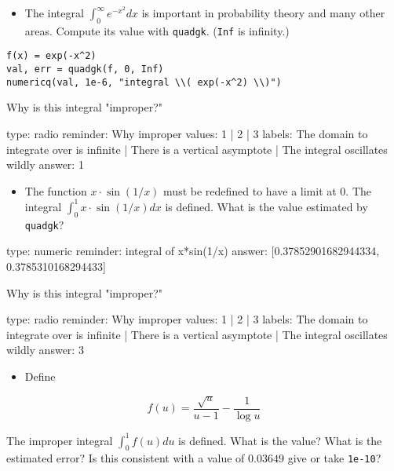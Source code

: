 \documentclass[12pt]{article}
\begin{document}
\begin{itemize}
\itemsep1pt\parskip0pt
\item
  The integral $\int_0^\infty e^{-x^2} dx$ is important in probability
  theory and many other areas. Compute its value with \texttt{quadgk}.
  (\texttt{Inf} is infinity.)
\end{itemize}



\begin{verbatim}
f(x) = exp(-x^2)
val, err = quadgk(f, 0, Inf)
numericq(val, 1e-6, "integral \\( exp(-x^2) \\)")
\end{verbatim}
Why is this integral "improper?"

\begin{answer}
type: radio
reminder: Why improper
values: 1 | 2 | 3
labels: The domain to integrate over is infinite | There is a vertical asymptote | The integral oscillates wildly
answer: 1
\end{answer}

\begin{itemize}
\itemsep1pt\parskip0pt
\item
  The function $x \cdot \sin(1/x)$ must be redefined to have a limit at
  $0$. The integral $\int_0^1 x \cdot \sin(1/x)dx$ is defined. What is
  the value estimated by \texttt{quadgk}?
\end{itemize}

\begin{answer}
    type: numeric
    reminder: integral of x*sin(1/x)
    answer: [0.37852901682944334, 0.3785310168294433]

\end{answer}

Why is this integral "improper?"

\begin{answer}
type: radio
reminder: Why improper
values: 1 | 2 | 3
labels: The domain to integrate over is infinite | There is a vertical asymptote | The integral oscillates wildly
answer: 3
\end{answer}

\begin{itemize}
\itemsep1pt\parskip0pt
\item
  Define
\end{itemize}

\[
f(u) = \frac{\sqrt{u}}{u-1} - \frac{1}{\log{u}}
\]

The improper integral $\int_0^1 f(u) du$ is defined. What is the value?
What is the estimated error? Is this consistent with a value of
$0.03649$ give or take \texttt{1e-10}?
\end{document}
